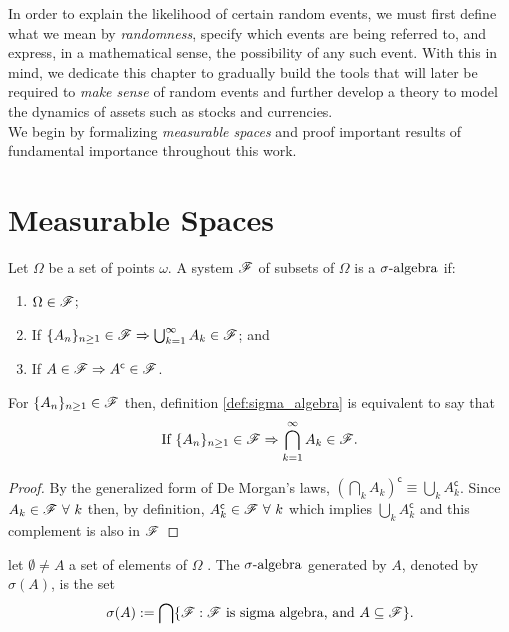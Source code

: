 \documentclass[../TGMAFFIRO.tex]{subfiles}
\begin{document}
In order to explain the likelihood of certain random events, we must first define what we mean by \textit{randomness}, specify which events are being referred to, and express, in a mathematical sense, the possibility of any such event. With this in mind, we dedicate this chapter to gradually build the tools that will later be required to \textit{make sense} of random events and further develop a theory to model the dynamics of assets such as stocks and currencies.\\

We begin by formalizing \textit{measurable spaces} and proof important results of fundamental importance throughout this work.

\section{Measurable Spaces}

\begin{definition}[\textbf{$\salg$}]\label{def:sigma_algebra}
	Let $\Omega$ be a set of points $\omega$. A system $\mathscr{F}$ of subsets of $\Omega$ is a $\salg$ if:
	\begin{enumerate}
		\item $\Omega \in \mathscr{F}$;
		\item If $\{A_n\}_{n\geq 1} \in \mathscr{F} \Rightarrow \bigcup_{k=1}^{\infty} A_k \in \mathscr{F}$; and
		\item If $A \in \mathscr{F} \Rightarrow A^\mathsf{c} \in \mathscr{F}$.
	\end{enumerate}
\end{definition}

\begin{remark}
	For $\{A_n\}_{n\geq 1} \in \mathscr{F}$ then, definition \ref{def:sigma_algebra} is equivalent to say that
	\begin{equation*}
		\text{If } \{A_n\}_{n\geq 1} \in \mathscr{F} \Rightarrow \bigcap_{k=1}^{\infty} A_k \in \mathscr{F}.
	\end{equation*}
\end{remark}

\begin{proof}
	By the generalized form of De Morgan's laws, $(\bigcap_k A_k)^\mathsf{c} \equiv \bigcup_k A_k^\mathsf{c}$. Since $A_k \in \mathscr{F} \ \forall \ k$ then, by definition,  $A_k^\mathsf{c} \in \mathscr{F} \ \forall \ k$ which implies  $\bigcup_k A_k^\mathsf{c}$ and this complement is also in $\mathscr{F}$
\end{proof}

\begin{definition}\label{generated_sigma_algebra}
	let $\emptyset \neq A$ a set of elements of $\Omega$ . The $\salg$ generated by $A$, denoted by $\sigma(A)$, is the set
	\begin{equation}
		\sigma(A) := \bigcap\{\mathscr{F} : \mathscr{F} \text{ is sigma algebra, and } A \subseteq \mathscr{F} \}.
	\end{equation}

\end{definition}
\end{document}
